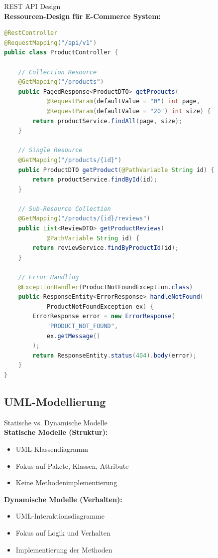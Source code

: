 \begin{example2}{REST API Design}\\
\textbf{Ressourcen-Design für E-Commerce System:}

\begin{lstlisting}[language=Java, style=basesmol]
@RestController
@RequestMapping("/api/v1")
public class ProductController {
    
    // Collection Resource
    @GetMapping("/products")
    public PagedResponse<ProductDTO> getProducts(
            @RequestParam(defaultValue = "0") int page,
            @RequestParam(defaultValue = "20") int size) {
        return productService.findAll(page, size);
    }
    
    // Single Resource
    @GetMapping("/products/{id}")
    public ProductDTO getProduct(@PathVariable String id) {
        return productService.findById(id);
    }
    
    // Sub-Resource Collection
    @GetMapping("/products/{id}/reviews")
    public List<ReviewDTO> getProductReviews(
            @PathVariable String id) {
        return reviewService.findByProductId(id);
    }
    
    // Error Handling
    @ExceptionHandler(ProductNotFoundException.class)
    public ResponseEntity<ErrorResponse> handleNotFound(
            ProductNotFoundException ex) {
        ErrorResponse error = new ErrorResponse(
            "PRODUCT_NOT_FOUND",
            ex.getMessage()
        );
        return ResponseEntity.status(404).body(error);
    }
}
\end{lstlisting}
\end{example2}

\pagebreak


\subsection{UML-Modellierung}

\begin{KR}{Statische vs. Dynamische Modelle}\\
\textbf{Statische Modelle (Struktur):}
\begin{itemize}
    \item UML-Klassendiagramm
    \item Fokus auf Pakete, Klassen, Attribute
    \item Keine Methodenimplementierung
\end{itemize}

\textbf{Dynamische Modelle (Verhalten):}
\begin{itemize}
    \item UML-Interaktionsdiagramme
    \item Fokus auf Logik und Verhalten
    \item Implementierung der Methoden
\end{itemize}
\end{KR}

